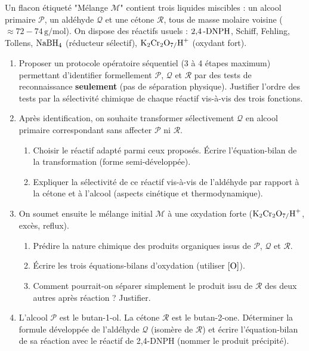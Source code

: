 \documentclass[11pt]{article}
\begin{document}
\begin{exercice}
Un flacon étiqueté "Mélange $\mathcal{M}$" contient trois liquides miscibles : un alcool primaire $\mathcal{P}$, un aldéhyde $\mathcal{Q}$ et une cétone $\mathcal{R}$, tous de masse molaire voisine ($\approx 72-74\,\si{\g\per\mol}$). On dispose des réactifs usuels : $\ce{2,4\text{-}DNPH}$, Schiff, Fehling, Tollens, $\ce{NaBH4}$ (réducteur sélectif), $\ce{K2Cr2O7/H+}$ (oxydant fort).
\begin{enumerate}
    \item Proposer un protocole opératoire séquentiel (3 à 4 étapes maximum) permettant d'identifier formellement $\mathcal{P}$, $\mathcal{Q}$ et $\mathcal{R}$ par des tests de reconnaissance \textbf{seulement} (pas de séparation physique). Justifier l'ordre des tests par la sélectivité chimique de chaque réactif vis-à-vis des trois fonctions.
    \item Après identification, on souhaite transformer sélectivement $\mathcal{Q}$ en alcool primaire correspondant sans affecter $\mathcal{P}$ ni $\mathcal{R}$.
    \begin{enumerate}
        \item Choisir le réactif adapté parmi ceux proposés. Écrire l'équation-bilan de la transformation (forme semi-développée).
        \item Expliquer la sélectivité de ce réactif vis-à-vis de l'aldéhyde par rapport à la cétone et à l'alcool (aspects cinétique et thermodynamique).
    \end{enumerate}
    \item On soumet ensuite le mélange initial $\mathcal{M}$ à une oxydation forte ($\ce{K2Cr2O7/H+}$, excès, reflux).
    \begin{enumerate}
        \item Prédire la nature chimique des produits organiques issus de $\mathcal{P}$, $\mathcal{Q}$ et $\mathcal{R}$.
        \item Écrire les trois équations-bilans d'oxydation (utiliser $\ce{[O]}$).
        \item Comment pourrait-on séparer simplement le produit issu de $\mathcal{R}$ des deux autres après réaction ? Justifier.
    \end{enumerate}
    \item L'alcool $\mathcal{P}$ est le butan-1-ol. La cétone $\mathcal{R}$ est le butan-2-one. Déterminer la formule développée de l'aldéhyde $\mathcal{Q}$ (isomère de $\mathcal{R}$) et écrire l'équation-bilan de sa réaction avec le réactif de 2,4-DNPH (nommer le produit précipité).
\end{enumerate}
\end{exercice}
\end{document}
